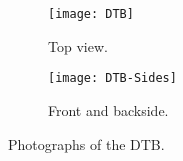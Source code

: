 \begin{figure}[ht]
	\centering
	\begin{subfigure}[b]{0.47\textwidth}
        \texttt{[image: DTB]}
		\caption{Top view.}
		\label{p10}
	\end{subfigure}
	\hfill
	\begin{subfigure}[b]{0.47\textwidth}
		\texttt{[image: DTB-Sides]}
		\caption{Front and backside.}
		\label{p11}
	\end{subfigure}
	\caption{Photographs of the \ac{DTB}.}
	\label{pdtb}
\end{figure}